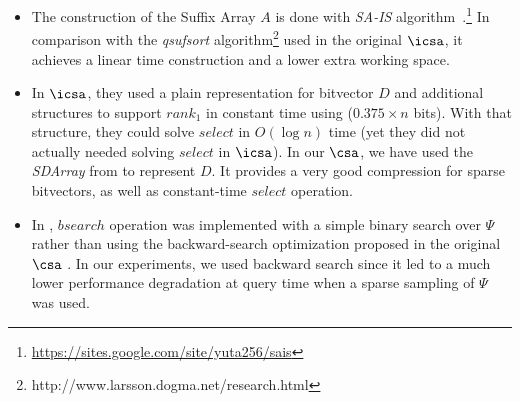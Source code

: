 \begin{itemize}
	\item The construction of the Suffix Array $A$ is done with 
	{\em SA-IS} algorithm~\cite{nong2011two}.\footnote{\url{ https://sites.google.com/site/yuta256/sais}} 
	In comparison with the  {\em qsufsort} algorithm\footnote{
		http://www.larsson.dogma.net/research.html}
	\cite{Larsson:2007:FSS:1314704.1314853} used in the original $\icsa$, it achieves a linear time construction 
	and a lower extra working space. 
	
	\item In  $\icsa$, they used a plain representation for bitvector $D$ and additional structures to support
	$rank_1$ in constant time using ($0.375\times n$ bits). With that structure, they could solve $select$ in $O(\log n)$ time (yet 
	they did not actually needed solving $select$ in $\icsa$).
	In our $\csa$, we have used the {\em SDArray} from \cite{okanohara2007practical} to represent $D$. It provides a very 
	good compression for sparse bitvectors, as well as constant-time $select$ operation.
	\item In \cite{FBNCPR12}, $bsearch$ operation was implemented with a simple binary search over $\Psi$ rather than
	using the  backward-search optimization proposed in the original $\csa$ \cite{Sad03}. In our experiments, we used
	backward search since it led to a much lower performance degradation at query time when a sparse sampling of $\Psi$ 
	was used.
	
\end{itemize}

